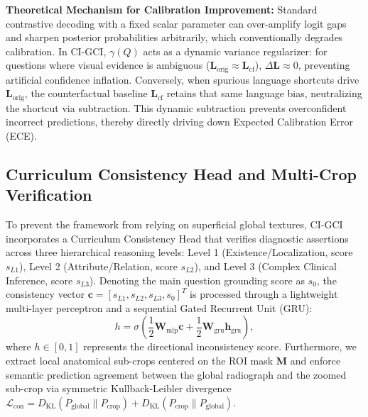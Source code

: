 \documentclass[journal,twoside,web]{ieeecolor}
\begin{document}
\noindent\textbf{Theoretical Mechanism for Calibration Improvement:} Standard contrastive decoding with a fixed scalar parameter can over-amplify logit gaps and sharpen posterior probabilities arbitrarily, which conventionally degrades calibration. In CI-GCI, $\gamma(Q)$ acts as a dynamic variance regularizer: for questions where visual evidence is ambiguous ($\mathbf{L}_{\text{orig}} \approx \mathbf{L}_{\text{cf}}$), $\Delta \mathbf{L} \approx 0$, preventing artificial confidence inflation. Conversely, when spurious language shortcuts drive $\mathbf{L}_{\text{orig}}$, the counterfactual baseline $\mathbf{L}_{\text{cf}}$ retains that same language bias, neutralizing the shortcut via subtraction. This dynamic subtraction prevents overconfident incorrect predictions, thereby directly driving down Expected Calibration Error (ECE).

\subsection{Curriculum Consistency Head and Multi-Crop Verification}
To prevent the framework from relying on superficial global textures, CI-GCI incorporates a Curriculum Consistency Head that verifies diagnostic assertions across three hierarchical reasoning levels: Level 1 (Existence/Localization, score $s_{L1}$), Level 2 (Attribute/Relation, score $s_{L2}$), and Level 3 (Complex Clinical Inference, score $s_{L3}$). Denoting the main question grounding score as $s_0$, the consistency vector $\mathbf{c} = [s_{L1}, s_{L2}, s_{L3}, s_0]^T$ is processed through a lightweight multi-layer perceptron and a sequential Gated Recurrent Unit (GRU):
\begin{equation}
h = \sigma\left(\frac{1}{2} \mathbf{W}_{\text{mlp}} \mathbf{c} + \frac{1}{2} \mathbf{W}_{\text{gru}} \mathbf{h}_{\text{gru}}\right),
\label{eq:consistency_score}
\end{equation}
where $h \in [0, 1]$ represents the directional inconsistency score. Furthermore, we extract local anatomical sub-crops centered on the ROI mask $\mathbf{M}$ and enforce semantic prediction agreement between the global radiograph and the zoomed sub-crop via symmetric Kullback-Leibler divergence $\mathcal{L}_{\text{con}} = D_{\text{KL}}(P_{\text{global}} \parallel P_{\text{crop}}) + D_{\text{KL}}(P_{\text{crop}} \parallel P_{\text{global}})$.
\end{document}
